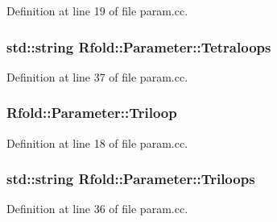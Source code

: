Definition at line 19 of file param.\+cc.

\hypertarget{namespace_rfold_1_1_parameter_aae84b42c9bbd350811296e721cf54d34}{
\subsubsection[{Tetraloops}]{\setlength{\rightskip}{0pt plus 5cm}std\+::string Rfold\+::\+Parameter\+::\+Tetraloops}}\label{namespace_rfold_1_1_parameter_aae84b42c9bbd350811296e721cf54d34}


Definition at line 37 of file param.\+cc.

\hypertarget{namespace_rfold_1_1_parameter_a7349c047e5809e731b6ab867fb74bf55}{
\subsubsection[{Triloop}]{ Rfold\+::\+Parameter\+::\+Triloop}}\label{namespace_rfold_1_1_parameter_a7349c047e5809e731b6ab867fb74bf55}


Definition at line 18 of file param.\+cc.

\hypertarget{namespace_rfold_1_1_parameter_ad65b27d73071fca1621f7f0cb02cacbc}{
\subsubsection[{Triloops}]{\setlength{\rightskip}{0pt plus 5cm}std\+::string Rfold\+::\+Parameter\+::\+Triloops}}\label{namespace_rfold_1_1_parameter_ad65b27d73071fca1621f7f0cb02cacbc}


Definition at line 36 of file param.\+cc.

